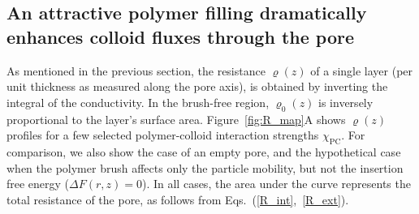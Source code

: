 \documentclass[12pt, a4paper]{article}
\begin{document}



\subsection{An attractive polymer filling dramatically enhances colloid fluxes through the pore}

As mentioned in the previous section, the resistance $\varrho(z)$ of a single layer (per unit thickness as measured along the pore axis), is obtained by inverting the integral of the conductivity.
In the brush-free region, $\varrho_{0}(z)$ is inversely proportional to the layer's surface area.
Figure~\ref{fig:R_map}A shows $\varrho(z)$ profiles for a few selected polymer-colloid interaction strengths $\chi_{\text{PC}}$.
For comparison, we also show the case of an empty pore, and the hypothetical case when the polymer brush affects only the particle mobility, but not the insertion free energy ($\Delta F(r,z) = 0$).
In all cases, the area under the curve represents the total resistance of the pore, as follows from Eqs.~(\ref{R_int},~\ref{R_ext}).
\end{document}
